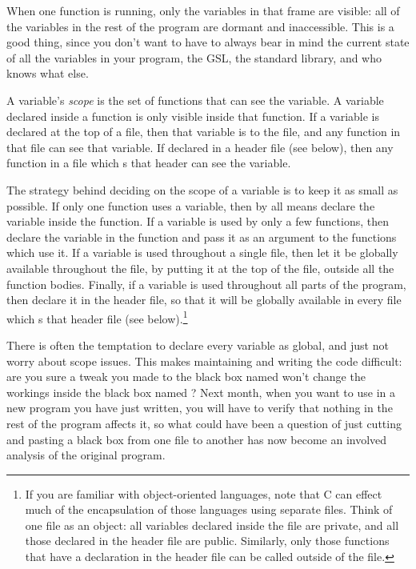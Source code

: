 \documentclass[12pt]{article}
\begin{document}
When one function is running, only the variables in that frame are
visible: all of the variables in the rest of the program are 
dormant and inaccessible.  This is a good thing, since you 
don't want to have to always bear in mind the current state of all the
variables in your program, the GSL, the standard library, and who knows
what else.

A variable's {\sl scope} is the set of functions that can see the
variable. A variable declared inside a function is only visible inside
that function.  If a variable is declared at the top of a file, then
that variable is  to the file, and any function in that
file can see that variable. If declared in a header file (see below),
then any function in a file which s that header  can see
the variable.

The strategy behind deciding on the scope of a variable is
to keep it as small as possible. If only one function uses a variable,
then by all means declare the variable inside the function.
If a variable is used by only a few functions,
then declare the variable in the  function and pass it as an
argument to the functions which use it. If a variable is used throughout
a single file, then let it be globally available throughout the file, by
putting it at the top of the file, outside all the function bodies. Finally,
if a variable is used throughout all parts of the program, then declare it in
the header file, so that it will be globally available in every
file which s that header file (see below).\footnote{If
you are familiar with object-oriented languages, note that C can effect
much of the encapsulation of those languages using separate files. Think
of one file as an object: all variables declared inside the file are
private, and all those declared in the header file are public. Similarly,
only those functions that have a declaration in the header file can be
called outside of the file.}

There is often the temptation to declare every variable as global, and
just not worry about scope issues. This makes maintaining and writing
the code difficult: are you sure a tweak you made to the black box named
 won't change the workings inside the black box named
? Next month, when you want to use 
in a new program you have just written, you will have to verify that nothing
in the rest of the program affects it, so what could have been a question
of just cutting and pasting a black box from one file to another has
now become an involved analysis of the original program.  
\end{document}

